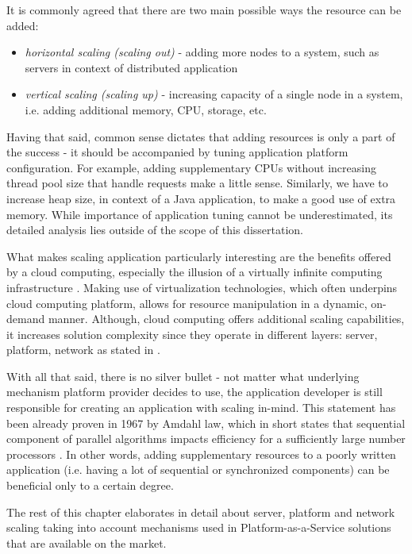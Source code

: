 It is commonly agreed that there are two main possible ways the resource can be added:
\begin{itemize}
	\item \textit{horizontal scaling (scaling out)} - adding more nodes to a system, such as servers in context of distributed application
	\item \textit{vertical scaling (scaling up)} - increasing capacity of a single node in a system, i.e. adding additional memory, CPU, storage, etc.
\end{itemize}

Having that said, common sense dictates that adding resources is only a part of the success - it should be accompanied by tuning application platform configuration. For example, adding supplementary CPUs without increasing thread pool size that handle requests make a little sense. Similarly, we have to increase heap size, in context of a Java application, to make a good use of extra memory. While importance of application tuning cannot be underestimated, its detailed analysis lies outside of the scope of this dissertation.

What makes scaling application particularly interesting are the benefits offered by a cloud computing, especially the illusion of a virtually infinite computing infrastructure \cite{VaRoBu11}. Making use of virtualization technologies, which often underpins cloud computing platform, allows for resource manipulation in a dynamic, on-demand manner. Although, cloud computing offers additional scaling capabilities, it increases solution complexity since they operate in different layers: server, platform, network as stated in \cite{VaRoBu11}.

With all that said, there is no silver bullet - not matter what underlying mechanism platform provider decides to use, the application developer is still responsible for creating an application with scaling in-mind. This statement has been already proven in 1967 by Amdahl law, which in short states that sequential component of parallel algorithms impacts efficiency for a sufficiently large number processors \cite{Am67}. In other words, adding supplementary resources to a poorly written application (i.e. having a lot of sequential or synchronized components) can be beneficial only to a certain degree.

The rest of this chapter elaborates in detail about server, platform and network scaling taking into account mechanisms used in Platform-as-a-Service solutions that are available on the market.

